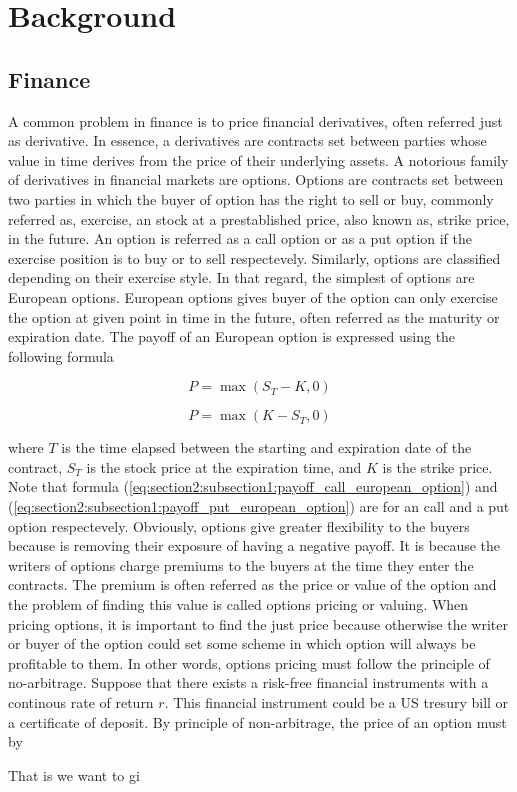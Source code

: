 
\section{Background} \label{sec:_background}

\subsection{Finance}

A common problem in finance is to price financial derivatives, often referred just
as derivative. In essence, a derivatives are contracts set between parties 
whose value in time derives from the price of their underlying assets. A notorious
family of derivatives in financial markets are options. Options are contracts set 
between two parties in which the buyer of option has the right to sell or buy, 
commonly referred as, exercise, an stock at a prestablished price, also known as, 
strike price, in the future. An option is referred as a call option or as a put 
option if the exercise position is to buy or to sell respectevely. Similarly, 
options are classified depending on their exercise style. In that regard,
the simplest of options are European options. European options gives buyer of 
the option can only exercise the option at given point in time in the future, 
often referred as the maturity or expiration date. The payoff of an European 
option is expressed using the following formula

\begin{equation}
  P = \max(S_T - K, 0)
  \label{eq:section2:subsection1:payoff_call_european_option}
\end{equation}

\begin{equation}
  P = \max(K - S_T, 0)
  \label{eq:section2:subsection1:payoff_put_european_option}
\end{equation}

where $T$ is the time elapsed between the starting and expiration date of the 
contract, $S_T$ is the stock price at the expiration time, and $K$ is the strike 
price. Note that formula (\ref*{eq:section2:subsection1:payoff_call_european_option})
and (\ref*{eq:section2:subsection1:payoff_put_european_option}) are for an call and a 
put option respectevely. Obviously, options give greater flexibility 
to the buyers because is removing their exposure of having a negative payoff.
It is because the writers of options charge premiums to the buyers at the time
they enter the contracts. The premium is often referred as the price or value 
of the option and the problem of finding this value is called options pricing or
valuing. When pricing options, it is important to find the just price because 
otherwise the writer or buyer of the option could set some scheme in which option
will always be profitable to them. In other words, options pricing must follow
the principle of no-arbitrage. Suppose that there exists a risk-free financial
instruments with a continous rate of return $r$. This financial instrument 
could be a US tresury bill or a certificate of deposit. By principle of non-arbitrage,
the price of an option must by 

That is we want to gi

